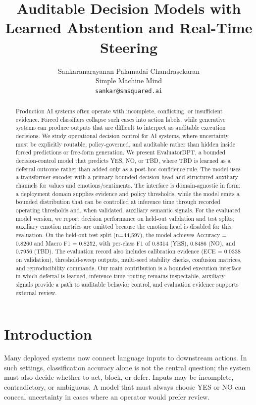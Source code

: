 \documentclass[11pt]{article}
\title{\textbf{Auditable Decision Models with Learned Abstention and Real-Time Steering}}
\author{
Sankaranarayanan Palamadai Chandrasekaran \\
Simple Machine Mind \\
\texttt{sankar@smsquared.ai}
}
\date{}
\begin{document}
\maketitle

\begin{abstract}
Production AI systems often operate with incomplete, conflicting, or insufficient evidence. Forced classifiers collapse such cases into action labels, while generative systems can produce outputs that are difficult to interpret as auditable execution decisions. We study operational decision control for AI systems, where uncertainty must be explicitly routable, policy-governed, and auditable rather than hidden inside forced predictions or free-form generation. We present EvaluatorDPT, a bounded decision-control model that predicts YES, NO, or TBD, where TBD is learned as a deferral outcome rather than added only as a post-hoc confidence rule. The model uses a transformer encoder with a primary bounded-decision head and structured auxiliary channels for values and emotions/sentiments. The interface is domain-agnostic in form: a deployment domain supplies evidence and policy thresholds, while the model emits a bounded distribution that can be controlled at inference time through recorded operating thresholds and, when validated, auxiliary semantic signals. For the evaluated model version, we report decision performance on held-out validation and test splits; auxiliary emotion metrics are omitted because the emotion head is disabled for this evaluation. On the held-out test split (n=44,597), the model achieves Accuracy = 0.8260 and Macro F1 = 0.8252, with per-class F1 of 0.8314 (YES), 0.8486 (NO), and 0.7956 (TBD). The evaluation record also includes calibration evidence (ECE = 0.0338 on validation), threshold-sweep outputs, multi-seed stability checks, confusion matrices, and reproducibility commands. Our main contribution is a bounded execution interface in which deferral is learned, inference-time routing remains inspectable, auxiliary signals provide a path to auditable behavior control, and evaluation evidence supports external review.
\end{abstract}

\section{Introduction}

Many deployed systems now connect language inputs to downstream actions. In such settings, classification accuracy alone is not the central question; the system must also decide whether to act, block, or defer. Inputs may be incomplete, contradictory, or ambiguous. A model that must always choose YES or NO can conceal uncertainty in cases where an operator would prefer review.
\end{document}
